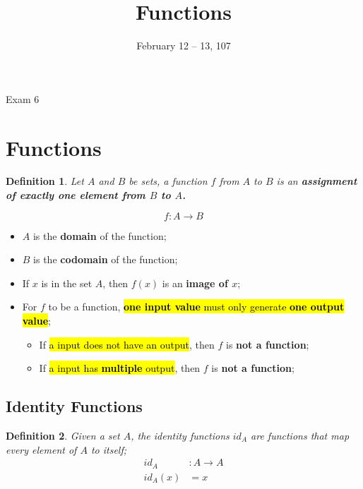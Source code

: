 \documentclass{note}
\date{February 12 -- 13, 107}
\title{Functions}
\newtheorem{definition}{Definition}
\begin{document}
    \begin{note}{Exam 6}

        \section{Functions}
        \begin{definition}
            Let $ A $ and $ B $ be sets, a function $ f $ from $ A $ to $ B $ is an \textbf{assignment of exactly one element
            from $ B $ to $ A $.}
        \end{definition}
        \begin{equation}\label{eq: function shorthand}
            f: A \to B
        \end{equation}

        \begin{itemize}
            \item $ A $ is the \textbf{domain} of the function;
            \item $ B $ is the \textbf{codomain} of the function;
            \item If $ x $ is in the set $ A $, then $ f(x) $ is an \textbf{image of $ x $};
            \item For $ f $ to be a function, \hl{\textbf{one input value} must only generate \textbf{one output value}};
            \begin{itemize}
                \item If \hl{a input does not have an output}, then $ f $ is \textbf{not a function};
                \item If \hl{a input has \textbf{multiple} output}, then $ f $ is \textbf{not a function};
            \end{itemize}
        \end{itemize}

        \subsection{Identity Functions}

        \begin{definition}
            Given a set $ A $, the identity functions $ id_{A} $ are functions that map every element of $ A $ to itself;
            \begin{align*}
                id_{A} &: A \to A\\
                id_{A}(x) &= x
            \end{align*}
        \end{definition}


\end{note}
\end{document}
